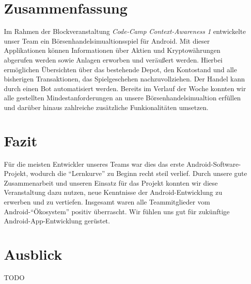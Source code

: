 \documentclass[a4paper]{article}
\begin{document}
\section{Zusammenfassung}
\label{sec:summary}
Im Rahmen der Blockveranstaltung \textit{Code-Camp Context-Awareness 1} entwickelte unser Team ein Börsenhandelsimualtionsspiel für Android. Mit dieser Applikationen können Informationen über Aktien und Kryptowährungen abgerufen werden sowie Anlagen erworben und veräußert werden. Hierbei ermöglichen Übersichten über das bestehende Depot, den Kontostand und alle bisherigen Transaktionen, das Spielgeschehen nachzuvollziehen. Der Handel kann durch einen Bot automatisiert werden. \newline
Bereits im Verlauf der Woche konnten wir alle gestellten Mindestanforderungen an unsere Börsenhandelsimualtion erfüllen und darüber hinaus zahlreiche zusätzliche Funkionalitäten umsetzen.


\section{Fazit}
\label{sec:conclusion}
Für die meisten Entwickler unseres Teams war dies das erste Android-Software-Projekt, wodurch die "`Lernkurve"' zu Beginn recht steil verlief. Durch unsere gute Zusammenarbeit und unseren Einsatz für das Projekt konnten wir diese Veranstaltung dazu nutzen, neue Kenntnisse der Android-Entwicklung zu erwerben und zu vertiefen. Insgesamt waren alle Teammitglieder vom Android-"`Ökosystem"' positiv überrascht. Wir fühlen uns gut für zukünftige Android-App-Entwicklung gerüstet.


\section{Ausblick}
\label{sec:outlook}
TODO

\begingroup
\raggedright
\printbibliography[title={Referenzen}]
\endgroup
\end{document}
